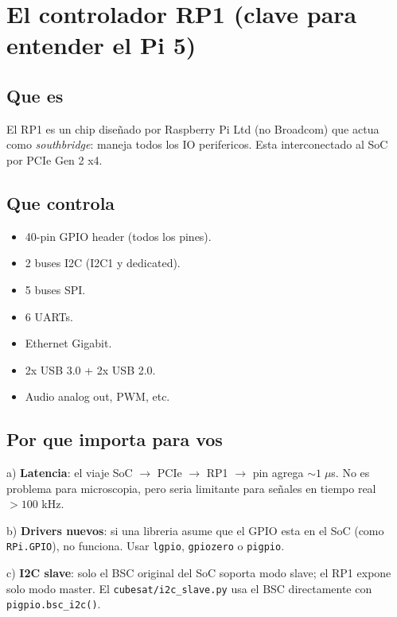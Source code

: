 \documentclass[11pt,a4paper,oneside]{report}
\begin{document}
\chapter{El controlador RP1 (clave para entender el Pi 5)}

\section{Que es}

El RP1 es un chip diseñado por Raspberry Pi Ltd (no Broadcom) que actua como
\emph{southbridge}: maneja todos los IO perifericos. Esta interconectado al
SoC por PCIe Gen 2 x4.

\section{Que controla}

\begin{itemize}[leftmargin=2em]
  \item 40-pin GPIO header (todos los pines).
  \item 2 buses I2C (I2C1 y dedicated).
  \item 5 buses SPI.
  \item 6 UARTs.
  \item Ethernet Gigabit.
  \item 2x USB 3.0 + 2x USB 2.0.
  \item Audio analog out, PWM, etc.
\end{itemize}

\section{Por que importa para vos}

a) \textbf{Latencia}: el viaje SoC $\to$ PCIe $\to$ RP1 $\to$ pin agrega $\sim 1\;\mu$s.
   No es problema para microscopia, pero seria limitante para señales en
   tiempo real $> 100$ kHz.

b) \textbf{Drivers nuevos}: si una libreria asume que el GPIO esta en el SoC
   (como \texttt{RPi.GPIO}), no funciona. Usar \texttt{lgpio}, \texttt{gpiozero}
   o \texttt{pigpio}.

c) \textbf{I2C slave}: solo el BSC original del SoC soporta modo slave; el
   RP1 expone solo modo master. El \texttt{cubesat/i2c\_slave.py} usa el BSC
   directamente con \texttt{pigpio.bsc\_i2c()}.

\end{document}
